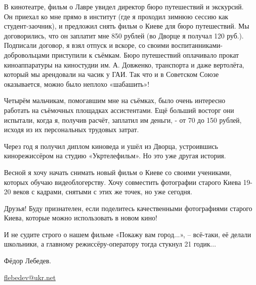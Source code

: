 В кинотеатре, фильм о Лавре увидел директор бюро путешествий и экскурсий. Он
приехал ко мне прямо в институт (где я проходил зимнюю сессию как
студент-заочник), и  предложил снять фильм о Киеве для бюро путешествий. Мы
договорились, что он заплатит мне 850 рублей (во Дворце я получал 120 руб.).
Подписали договор, я взял отпуск и вскоре, со своими
воспитанниками-добровольцами приступили к съёмкам. Бюро путешествий оплачивало
прокат киноаппаратуры на киностудии им. А. Довженко, транспорта и даже вертолёта,
который мы арендовали на часик у ГАИ. Так что и в Советском Союзе оказывается,
можно было неплохо «шабашить»!


Четырём мальчикам, помогавшим мне на съёмках, было очень интересно работать на
съёмочных площадках ассистентами. Ещё больший восторг они испытали, когда я,
получив расчёт, заплатил им деньги, - от 70 до 150 рублей, исходя из их
персональных  трудовых затрат.


Через год я получил диплом киноведа и ушёл из Дворца, устроившись
кинорежиссёром на студию «Укртелефильм». Но это уже другая история. 


Весной я хочу начать снимать новый фильм о Киеве со своими учениками, которых
обучаю видеоблогерству. Хочу совместить фотографии старого Киева 19-20 веков с
кадрами, снятыми с этих же точек, но уже сегодня.


Друзья! Буду признателен, если поделитесь качественными фотографиями старого
Киева, которые можно использовать в новом кино!

И не судите строго о нашем фильме «Покажу вам город...», – всё-таки, её делали
школьники, а главному режиссёру-оператору тогда стукнул 21 годик...

Фёдор Лебедев.

\url{flebedev@ukr.net}

